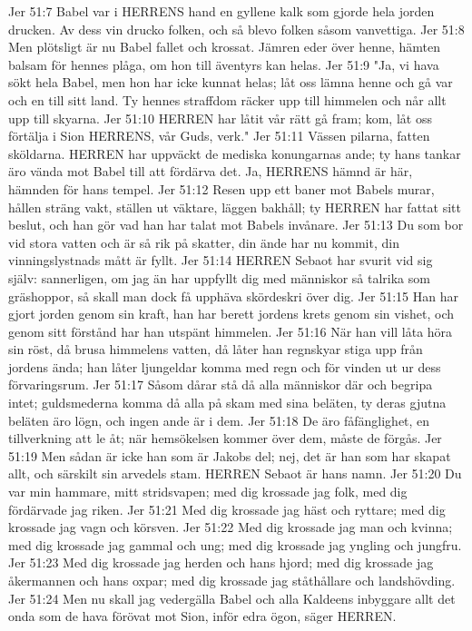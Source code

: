 Jer 51:7  Babel var i HERRENS hand en gyllene kalk som gjorde hela jorden drucken. Av dess vin drucko folken, och så blevo folken såsom vanvettiga.
Jer 51:8  Men plötsligt är nu Babel fallet och krossat. Jämren eder över henne, hämten balsam för hennes plåga, om hon till äventyrs kan helas.
Jer 51:9  "Ja, vi hava sökt hela Babel, men hon har icke kunnat helas; låt oss lämna henne och gå var och en till sitt land. Ty hennes straffdom räcker upp till himmelen och når allt upp till skyarna.
Jer 51:10  HERREN har låtit vår rätt gå fram; kom, låt oss förtälja i Sion HERRENS, vår Guds, verk."
Jer 51:11  Vässen pilarna, fatten sköldarna. HERREN har uppväckt de mediska konungarnas ande; ty hans tankar äro vända mot Babel till att fördärva det. Ja, HERRENS hämnd är här, hämnden för hans tempel.
Jer 51:12  Resen upp ett baner mot Babels murar, hållen sträng vakt, ställen ut väktare, läggen bakhåll; ty HERREN har fattat sitt beslut, och han gör vad han har talat mot Babels invånare.
Jer 51:13  Du som bor vid stora vatten och är så rik på skatter, din ände har nu kommit, din vinningslystnads mått är fyllt.
Jer 51:14  HERREN Sebaot har svurit vid sig själv: sannerligen, om jag än har uppfyllt dig med människor så talrika som gräshoppor, så skall man dock få upphäva skördeskri över dig.
Jer 51:15  Han har gjort jorden genom sin kraft, han har berett jordens krets genom sin vishet, och genom sitt förstånd har han utspänt himmelen.
Jer 51:16  När han vill låta höra sin röst, då brusa himmelens vatten, då låter han regnskyar stiga upp från jordens ända; han låter ljungeldar komma med regn och för vinden ut ur dess förvaringsrum.
Jer 51:17  Såsom dårar stå då alla människor där och begripa intet; guldsmederna komma då alla på skam med sina beläten, ty deras gjutna beläten äro lögn, och ingen ande är i dem.
Jer 51:18  De äro fåfänglighet, en tillverkning att le åt; när hemsökelsen kommer över dem, måste de förgås.
Jer 51:19  Men sådan är icke han som är Jakobs del; nej, det är han som har skapat allt, och särskilt sin arvedels stam. HERREN Sebaot är hans namn.
Jer 51:20  Du var min hammare, mitt stridsvapen; med dig krossade jag folk, med dig fördärvade jag riken.
Jer 51:21  Med dig krossade jag häst och ryttare; med dig krossade jag vagn och körsven.
Jer 51:22  Med dig krossade jag man och kvinna; med dig krossade jag gammal och ung; med dig krossade jag yngling och jungfru.
Jer 51:23  Med dig krossade jag herden och hans hjord; med dig krossade jag åkermannen och hans oxpar; med dig krossade jag ståthållare och landshövding.
Jer 51:24  Men nu skall jag vedergälla Babel och alla Kaldeens inbyggare allt det onda som de hava förövat mot Sion, inför edra ögon, säger HERREN.
